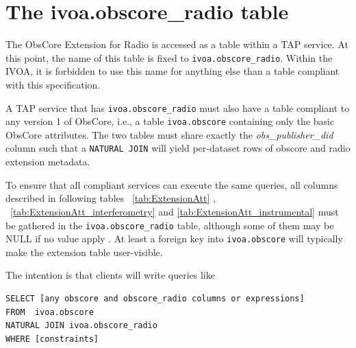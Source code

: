 \documentclass[11pt,a4paper]{ivoa}
\begin{document}

\section{The ivoa.obscore\_radio table}
\label{sec:implementation}
The ObsCore Extension for Radio is accessed as a table within a TAP
\citep{2019ivoa.spec.0927D} service.  At this
point, the name of this table is fixed to \verb|ivoa.obscore_radio|.
Within the IVOA, it is forbidden to use this name for anything else than a table compliant
with this specification.


A TAP service that has \verb|ivoa.obscore_radio| must also have a table
compliant to any version 1 of ObsCore, i.e., a table
\verb|ivoa.obscore| containing only the basic ObsCore attributes. The two tables must share exactly the \emph{obs\_publisher\_did} column such
that a \verb|NATURAL JOIN| will yield per-dataset rows of obscore and
radio extension metadata.  

To ensure that all compliant services can execute the same queries,
all columns described in following tables ~\ref{tab:ExtensionAtt} , ~\ref{tab:ExtensionAtt_interferometry} and \ref{tab:ExtensionAtt_instrumental} must be gathered  in the \verb|ivoa.obscore_radio|
table, although some of them may be NULL if no value apply . At least a foreign key into \verb|ivoa.obscore| will typically
make the extension table user-visible. 

The intention is that clients will write queries like
\begin{lstlisting}
SELECT [any obscore and obscore_radio columns or expressions]
FROM  ivoa.obscore
NATURAL JOIN ivoa.obscore_radio
WHERE [constraints]
\end{lstlisting}


\end{document}
